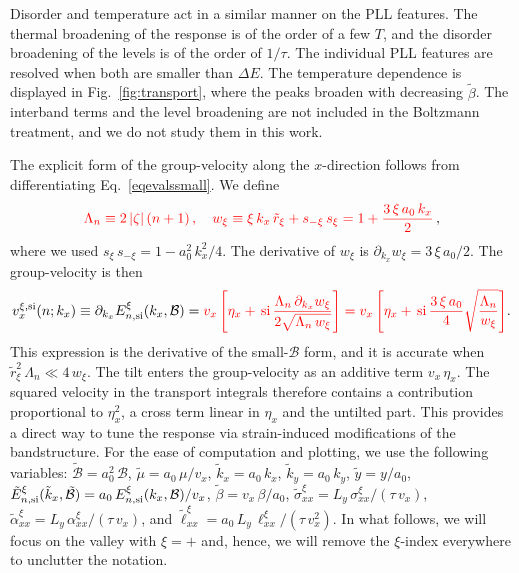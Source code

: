 \documentclass[aps,prb, onecolumn, nofootinbib, citeautoscript,10pt]{revtex4-2}
\newcommand{\red}[1]{{\color{red}#1}}
\begin{document}
Disorder and temperature act in a similar manner on the PLL features. The thermal broadening of the response is of the order of a few $T$, and the disorder broadening of the levels is of the order of $1/\tau$. The individual PLL features are resolved when both are smaller than $\Delta E$. The temperature dependence is displayed in Fig.~\ref{fig:transport}, where the peaks broaden with decreasing $\tilde\beta$. The interband terms and the level broadening are not included in the Boltzmann treatment, and we do not study them in this work.


The explicit form of the group-velocity along the $x$-direction follows from differentiating Eq.~\eqref{eqevalssmall}. \red{We define}
\begin{align}
\red{\Lambda_n \equiv 2\,|\zeta|\,(n + 1)\,, \quad
w_\xi \equiv \xi\,k_x\,\tilde r_\xi + s_{-\xi}\,s_\xi = 1 + \frac{3\,\xi\,a_0\,k_x}{2}}\,, \notag
\end{align}
\red{where we used $s_\xi\,s_{-\xi} = 1 - a_0^2\,k_x^2/4$. The derivative of $w_\xi$ is $\partial_{k_x} w_\xi = 3\,\xi\,a_0/2$. The group-velocity is then}
\begin{align}
v^{\xi, \text{si}}_x (n; k_x) \equiv \partial_{k_x}  E^{\xi}_{n, \rm{si}} (k_x, \mathcal B)  
= \red{v_x \left[ \eta_x +\, \mathrm{si}\, \frac{ \Lambda_n\,\partial_{k_x} w_\xi }
{ 2 \sqrt{ \Lambda_n\,w_\xi } } \right]
= v_x \left[ \eta_x +\, \mathrm{si}\, \frac{3\,\xi\,a_0}{4} \sqrt{ \frac{ \Lambda_n }{ w_\xi } } \right]}.
\label{eqgv}
\end{align}
\red{This expression is the derivative of the small-$\mathcal B$ form, and it is accurate when $\tilde r_\xi^2\,\Lambda_n \ll 4\,w_\xi$. The tilt enters the group-velocity as an additive term $v_x\,\eta_x$. The squared velocity in the transport integrals therefore contains a contribution proportional to $\eta_x^2$, a cross term linear in $\eta_x$ and the untilted part.} This provides a direct way to tune the response via strain-induced modifications of the bandstructure. 
For the ease of computation and plotting, we use the following variables: $ \tilde{\mathcal B }  = a_0^2 \, \mathcal B$, $\tilde \mu  = a_0 \, \mu/ v_x $, $\tilde k_x  = a_0 \, k_x $, $\tilde k_y =  a_0 \, k_y $, $\tilde y = y/a_0 $, $\tilde  E^{\xi}_{n, \rm{si}} (\tilde k_x, \tilde{\mathcal B} ) = a_0 \,  E^{\xi}_{n, \rm{si}} (k_x, \mathcal B) / v_x $, $\tilde \beta =  v_x\, \beta/a_0 $, $\tilde \sigma^\xi_{xx}  = L_y \, \sigma_{xx}^\xi / (\tau \, v_x ) $, $ \tilde \alpha^\xi_{xx}  = L_y \, \alpha_{xx}^\xi / (\tau \, v_x ) $, and $ \tilde \ell^\xi_{xx}  = a_0 \, L_y \, \ell_{xx}^\xi / ( \tau \, v_x^2 ) $. In what follows, we will focus on the valley with $\xi = + $ and, hence, we will remove the $\xi$-index everywhere \red{to unclutter the notation}.
\end{document}

